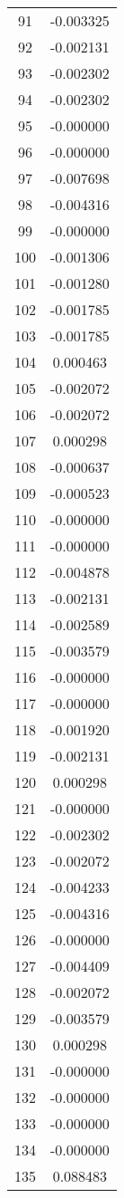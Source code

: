 \documentclass[12pt]{article}
\begin{document}
\begin{longtable}{@{}cc@{}}
91 & -0.003325 \\
92 & -0.002131 \\
93 & -0.002302 \\
94 & -0.002302 \\
95 & -0.000000 \\
96 & -0.000000 \\
97 & -0.007698 \\
98 & -0.004316 \\
99 & -0.000000 \\
100 & -0.001306 \\
101 & -0.001280 \\
102 & -0.001785 \\
103 & -0.001785 \\
104 & 0.000463 \\
105 & -0.002072 \\
106 & -0.002072 \\
107 & 0.000298 \\
108 & -0.000637 \\
109 & -0.000523 \\
110 & -0.000000 \\
111 & -0.000000 \\
112 & -0.004878 \\
113 & -0.002131 \\
114 & -0.002589 \\
115 & -0.003579 \\
116 & -0.000000 \\
117 & -0.000000 \\
118 & -0.001920 \\
119 & -0.002131 \\
120 & 0.000298 \\
121 & -0.000000 \\
122 & -0.002302 \\
123 & -0.002072 \\
124 & -0.004233 \\
125 & -0.004316 \\
126 & -0.000000 \\
127 & -0.004409 \\
128 & -0.002072 \\
129 & -0.003579 \\
130 & 0.000298 \\
131 & -0.000000 \\
132 & -0.000000 \\
133 & -0.000000 \\
134 & -0.000000 \\
135 & 0.088483 \\

\end{longtable}
\end{document}
